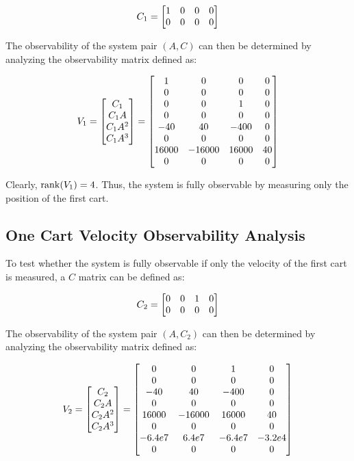 \documentclass[]{article}
\begin{document}
		\begin{equation}
			C_1 = \mqty[1	&0	&0	&0\\
					  	0	&0	&0	&0]
		\end{equation}

		The observability of the system pair $(A, C)$ can then be determined by analyzing the observability matrix defined as:
		
		\begin{equation}
			V_1 = \mqty[C_1\\ C_1A\\ C_1A^2\\ C_1A^3]
				= \mqty[1		&0		&0		&0\\
						0		&0		&0		&0\\
						0		&0		&1		&0\\
						0		&0		&0		&0\\
						-40		&40		&-400	&0\\
						0		&0		&0		&0\\
						16000	&-16000	&16000	&40\\
						0		&0		&0		&0]
		\end{equation}
		
		Clearly, $\rank(V_1) = 4$. Thus, the system is fully observable by measuring only the position of the first cart.

	\subsection{One Cart Velocity Observability Analysis}
		To test whether the system is fully observable if only the velocity of the first cart is measured, a $C$ matrix can be defined as:
		
		\begin{equation}
			C_2 = \mqty[0	&0	&1	&0\\
						0	&0	&0	&0]
		\end{equation}
		
		The observability of the system pair $(A, C_2)$ can then be determined by analyzing the observability matrix defined as:
		
		\begin{equation}
			V_2 = \mqty[C_2\\ C_2A\\ C_2A^2\\ C_2A^3]
				= \mqty[0		&0		&1		&0\\
						0		&0		&0		&0\\
						-40		&40		&-400	&0\\
						0		&0		&0		&0\\
						16000	&-16000	&16000	&40\\
						0		&0		&0		&0\\
						-6.4e7	&6.4e7	&-6.4e7	&-3.2e4\\
						0		&0		&0		&0]
		\end{equation}
		
\end{document}
